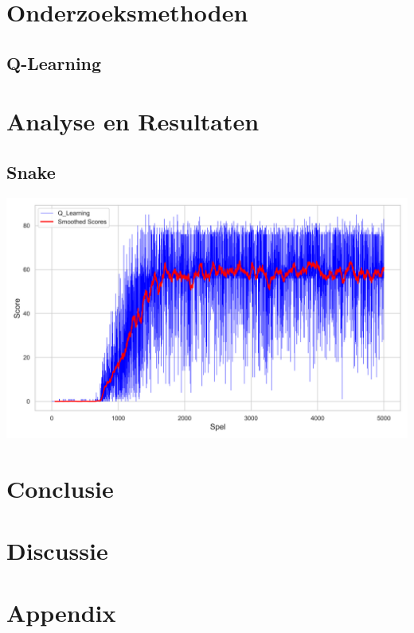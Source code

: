 \documentclass[a4paper,12pt]{report}
\begin{document}
\chapter{Onderzoeksmethoden}
\section{Q-Learning}

\chapter{Analyse en Resultaten}

\section{Snake}

\includegraphics[width=1\textwidth]{assets/Q-LearningGrafiek.png}

\chapter{Conclusie}

\chapter{Discussie}

\chapter*{Appendix}

\printbibliography
{}
\end{document}
